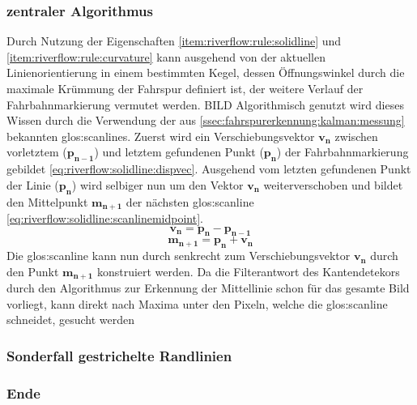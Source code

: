 \subsubsection{zentraler Algorithmus}
Durch Nutzung der Eigenschaften \ref{item:riverflow:rule:solidline} und  \ref{item:riverflow:rule:curvature} kann ausgehend von der aktuellen Linienorientierung in einem bestimmten Kegel, dessen Öffnungswinkel durch die maximale Krümmung der Fahrspur definiert ist, der weitere Verlauf der Fahrbahnmarkierung vermutet werden. BILD
Algorithmisch genutzt wird dieses Wissen durch die Verwendung der aus \ref{ssec:fahrspurerkennung:kalman:messung} bekannten \glspl{glos:scanline}.
Zuerst wird ein Verschiebungsvektor \begin{math} \boldsymbol{v_n} \end{math} zwischen vorletztem (\begin{math} \boldsymbol{p_{n-1}} \end{math}) und letztem gefundenen Punkt  (\begin{math} \boldsymbol{p_n} \end{math})  der Fahrbahnmarkierung gebildet \eqref{eq:riverflow:solidline:dispvec}. Ausgehend vom letzten gefundenen Punkt der Linie (\begin{math} \boldsymbol{p_n} \end{math}) wird selbiger nun um den Vektor \begin{math} \boldsymbol{v_n} \end{math} weiterverschoben und bildet den Mittelpunkt  \begin{math} \boldsymbol{m_{n+1}}  \end{math} der nächsten \gls{glos:scanline} \eqref{eq:riverflow:solidline:scanlinemidpoint}.
\begin{equation}
\label{eq:riverflow:solidline:dispvec}
\boldsymbol{v_n} =  \boldsymbol{p_n} - \boldsymbol{p_{n-1}}
\end{equation}
\begin{equation}
\label{eq:riverflow:solidline:scanlinemidpoint}
\boldsymbol{m_{n+1}} =  \boldsymbol{p_n} + \boldsymbol{v_n}
\end{equation}
 Die \gls{glos:scanline} kann nun durch senkrecht zum Verschiebungsvektor \begin{math} \boldsymbol{v_n} \end{math}  durch den Punkt \(\boldsymbol{m_{n+1}}\) konstruiert werden.
Da die Filterantwort des Kantendetekors durch den Algorithmus zur Erkennung der Mittellinie schon für das gesamte Bild vorliegt, kann direkt nach Maxima unter den Pixeln, welche die \gls{glos:scanline} schneidet, gesucht werden

\subsubsection{Sonderfall gestrichelte Randlinien}
\subsubsection{Ende}